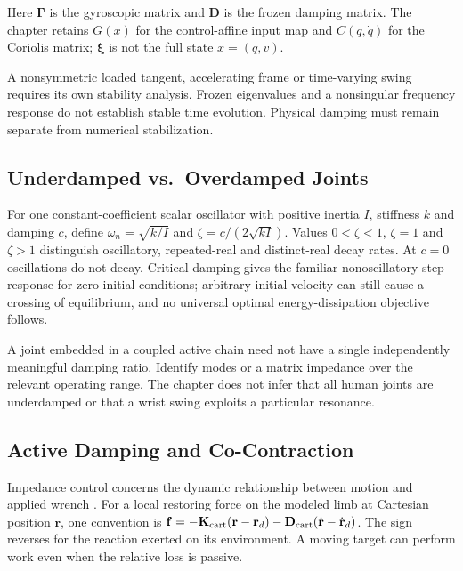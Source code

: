 Here \(\boldsymbol\Gamma\) is the gyroscopic matrix and \(\mathbf D\) is the frozen damping matrix. The chapter retains \(G(x)\) for the control-affine input map and \(C(q,\dot q)\) for the Coriolis matrix; \(\boldsymbol\xi\) is not the full state \(x=(q,v)\).

A nonsymmetric loaded tangent, accelerating frame or time-varying swing requires its own stability analysis. Frozen eigenvalues and a nonsingular frequency response do not establish stable time evolution. Physical damping must remain separate from numerical stabilization.

\subsection{Underdamped vs.~Overdamped
Joints}\label{underdamped-vs.-overdamped-joints}

For one constant-coefficient scalar oscillator with positive inertia \(I\), stiffness \(k\) and damping \(c\), define \(\omega_n=\sqrt{k/I}\) and \(\zeta=c/(2\sqrt{kI})\). Values \(0<\zeta<1\), \(\zeta=1\) and \(\zeta>1\) distinguish oscillatory, repeated-real and distinct-real decay rates. At \(c=0\) oscillations do not decay. Critical damping gives the familiar nonoscillatory step response for zero initial conditions; arbitrary initial velocity can still cause a crossing of equilibrium, and no universal optimal energy-dissipation objective follows.

A joint embedded in a coupled active chain need not have a single independently meaningful damping ratio. Identify modes or a matrix impedance over the relevant operating range. The chapter does not infer that all human joints are underdamped or that a wrist swing exploits a particular resonance.

\subsection{Active Damping and
Co-Contraction}\label{active-damping-and-co-contraction}

Impedance control concerns the dynamic relationship between motion and applied wrench \citep{hogan1985impedance}. For a local restoring force on the modeled limb at Cartesian position \(\mathbf r\), one convention is \(\mathbf f=-\mathbf K_{\rm cart}(\mathbf r-\mathbf r_d)-\mathbf D_{\rm cart}(\dot{\mathbf r}-\dot{\mathbf r}_d)\). The sign reverses for the reaction exerted on its environment. A moving target can perform work even when the relative loss is passive.

